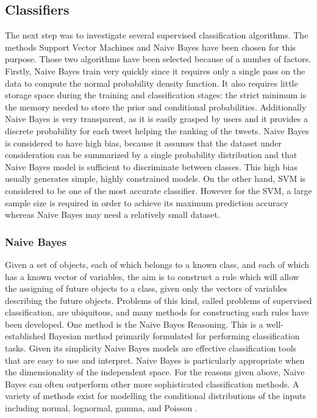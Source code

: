 \subsection{Classifiers}
The next step was to investigate several supervised classification algorithms. The methods Support Vector Machines and Naive Bayes have been chosen for this purpose. Those two algorithms have been selected because of a number of factors. Firstly, Naive Bayes train very quickly since it requires only a single pass on the data to compute the normal probability density function. It also requires little storage space during the training and classification stages: the strict minimum is the memory needed to store the prior and conditional probabilities. Additionally Naive Bayes is very transparent, as it is easily grasped by users and it provides a discrete probability for each tweet helping the ranking of the tweets. Naive Bayes is considered to have high bias, because it assumes that the dataset under consideration can be summarized by a single probability distribution and that Naive Bayes model is sufficient to discriminate between classes. This high bias usually generates simple, highly constrained models. On the other hand, SVM is considered to be one of the most accurate classifier. However for the SVM, a large sample size is required in order to achieve its maximum prediction accuracy whereas Naive Bayes may need a relatively small dataset.

\subsubsection{Naive Bayes}
Given a set of objects, each of which belongs to a known class, and each of which has a known vector of variables, the aim is to construct a rule which will allow the assigning of future objects to a class, given only the vectors of variables describing the future objects. Problems of this kind, called problems of supervised classification, are ubiquitous, and many methods for constructing such rules have been developed. One method is the Naive Bayes Reasoning. This is a well-established Bayesian method primarily formulated for performing classification tasks. Given its simplicity Naive Bayes models are effective classification tools that are easy to use and interpret. Naive Bayes is particularly appropriate when the dimensionality of the independent space. For the reasons given above, Naive Bayes can often outperform other more sophisticated classification methods. A variety of methods exist for modelling the conditional distributions of the inputs including normal, lognormal, gamma, and Poisson \cite{Barber}. 

